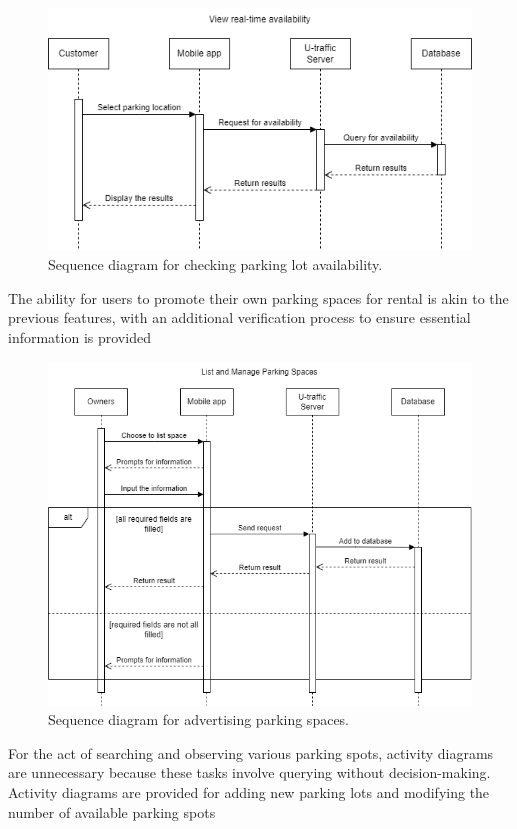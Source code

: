 \begin{figure}[H]
    \centering
    \includegraphics[width=\linewidth]{assets/images/Implementation/Parking/Availability.drawio.png}
    \caption{Sequence diagram for checking parking lot availability.}
    \label{fig:parking_availability}
\end{figure}

The ability for users to promote their own parking spaces for rental is akin to the previous features, with an additional verification process to ensure essential information is provided

\begin{figure}[H]
    \centering
    \includegraphics[width=0.8\linewidth]{assets/images/Implementation/Parking/List and Manage.drawio.png}
    \caption{Sequence diagram for advertising parking spaces.}
    \label{fig:parking_search}
\end{figure}


For the act of searching and observing various parking spots, activity diagrams are unnecessary because these tasks involve querying without decision-making. Activity diagrams are provided for adding new parking lots and modifying the number of available parking spots

